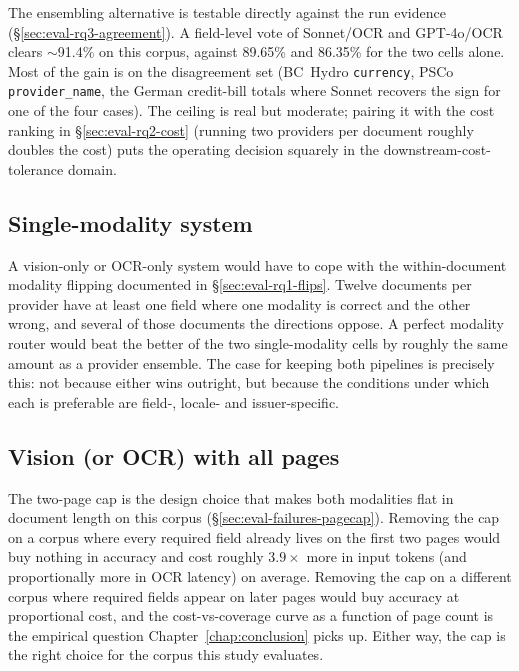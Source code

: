 The ensembling alternative is testable directly against the run
evidence (\S\ref{sec:eval-rq3-agreement}). A field-level vote of
Sonnet/OCR and GPT-4o/OCR clears $\sim$91.4\% on this corpus,
against 89.65\% and 86.35\% for the two cells alone. Most of the
gain is on the disagreement set (BC~Hydro \texttt{currency},
PSCo \texttt{provider\_name}, the German credit-bill totals where
Sonnet recovers the sign for one of the four cases). The ceiling
is real but moderate; pairing it with the cost ranking in
\S\ref{sec:eval-rq2-cost} (running two providers per document
roughly doubles the cost) puts the operating decision squarely in
the downstream-cost-tolerance domain.

\subsection{Single-modality system}
\label{sec:eval-alternatives-singlemod}

A vision-only or OCR-only system would have to cope with the
within-document modality flipping documented in
\S\ref{sec:eval-rq1-flips}. Twelve documents per provider have at
least one field where one modality is correct and the other wrong,
and several of those documents the directions oppose. A perfect
modality router would beat the better of the two single-modality
cells by roughly the same amount as a provider ensemble. The case
for keeping both pipelines is precisely this: not because either
wins outright, but because the conditions under which each is
preferable are field-, locale- and issuer-specific.

\subsection{Vision (or OCR) with all pages}
\label{sec:eval-alternatives-allpages}

The two-page cap is the design choice that makes both modalities
flat in document length on this corpus
(\S\ref{sec:eval-failures-pagecap}). Removing the cap on a corpus
where every required field already lives on the first two pages
would buy nothing in accuracy and cost roughly $3.9\times$ more in
input tokens (and proportionally more in OCR latency) on average.
Removing the cap on a different corpus where required fields appear
on later pages would buy accuracy at proportional cost, and the
cost-vs-coverage curve as a function of page count is the
empirical question Chapter~\ref{chap:conclusion} picks up. Either
way, the cap is the right choice for the corpus this study
evaluates.

